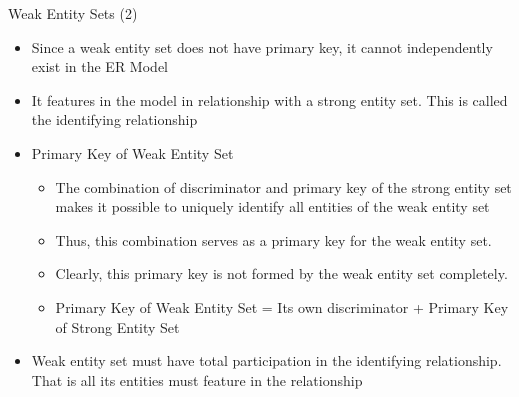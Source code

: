 \documentclass[aspectratio=169, xcolor=dvipsnames]{beamer}
\begin{document}
\begin{frame}{Weak Entity Sets (2)}
    \begin{itemize}[<+->]
        \item Since a weak entity set does not have primary key, it cannot independently exist in the ER Model
        \item It features in the model in relationship with a strong entity set. This is called the identifying relationship
        \item Primary Key of Weak Entity Set
        \begin{itemize}
            \item[$\triangleright$] The combination of discriminator and primary key of the strong entity set makes it possible to uniquely identify all entities of the weak entity set
            \item[$\triangleright$] Thus, this combination serves as a primary key for the weak entity set.
            \item[$\triangleright$] Clearly, this primary key is not formed by the weak entity set completely.
            \item[$\triangleright$] Primary Key of Weak Entity Set = Its own discriminator + Primary Key of Strong Entity Set
        \end{itemize}
        \item Weak entity set must have total participation in the identifying relationship. That is all its entities must feature in the relationship
    \end{itemize}
\end{frame}
\end{document}
